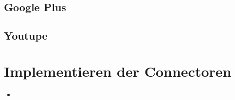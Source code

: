 \subsection{Google Plus} %
\label{sub:google_plus}

\subsection{Youtupe} %
\label{sub:youtupe}



\section{Implementieren der Connectoren} %
\label{sec:implementieren_der_connectoren}

\begin{itemize}
    \item 
\end{itemize}

